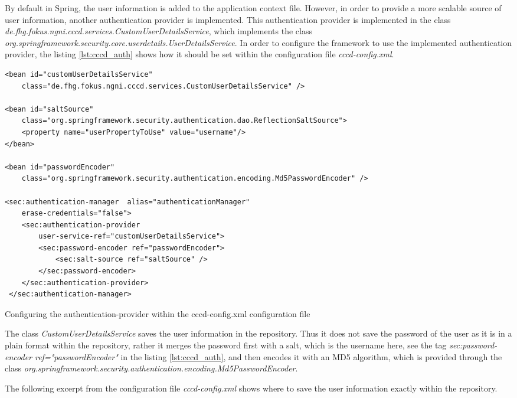 By default in Spring, the user information is added to the application context file. However, in order to provide a more scalable source of user information, another authentication provider is implemented. This authentication provider is implemented in the class \textit{de.fhg.fokus.ngni.cccd.services.CustomUserDetailsService}, which implements the class  \textit{org.springframework.security.core.userdetails.UserDetailsService}. In order to configure the framework to use the implemented authentication provider, the listing \ref{lst:cccd_auth} shows how it should be set within the configuration file \textit{cccd-config.xml}.

\begin{code}
\begin{verbatim}
<bean id="customUserDetailsService" 
	class="de.fhg.fokus.ngni.cccd.services.CustomUserDetailsService" />

<bean id="saltSource" 
	class="org.springframework.security.authentication.dao.ReflectionSaltSource">
	<property name="userPropertyToUse" value="username"/>
</bean>

<bean id="passwordEncoder" 
	class="org.springframework.security.authentication.encoding.Md5PasswordEncoder" />

<sec:authentication-manager  alias="authenticationManager" 
	erase-credentials="false">
	<sec:authentication-provider 
		user-service-ref="customUserDetailsService">
 		<sec:password-encoder ref="passwordEncoder">
 			<sec:salt-source ref="saltSource" />
 		</sec:password-encoder>
 	</sec:authentication-provider>
 </sec:authentication-manager>
\end{verbatim}
\caption{Configuring the authentication-provider within the cccd-config.xml configuration file}
\label{lst:cccd_auth}
\end{code}

The class \textit{CustomUserDetailsService} saves the user information in the repository. Thus it does not save the password of the user as it is in a plain format within the repository, rather it merges the password first with a salt, which is the username here, see the tag \textit{sec:password-encoder ref="passwordEncoder"} in the listing \ref{lst:cccd_auth}, and then encodes it with an MD5 algorithm, which is provided through the class \textit{org.springframework.security.authentication.encoding.Md5PasswordEncoder}.

The following excerpt from the configuration file \textit{cccd-config.xml} shows where to save the user information exactly within the repository.

